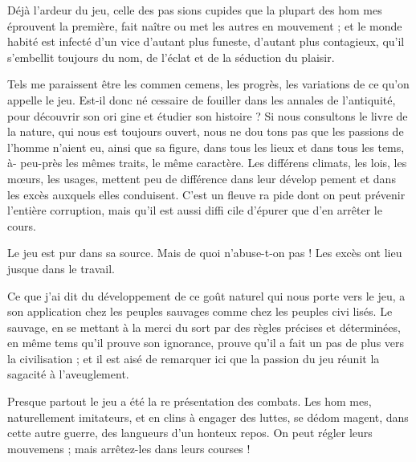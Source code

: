 Déjà l'ardeur du jeu, celle des pas%
sions cupides que la plupart des hom%
mes éprouvent la première, fait naître
ou met les autres en mouvement ; et
le monde habité est infecté d'un vice
d'autant plus funeste, d'autant plus
contagieux, qu'il s'embellit toujours
du nom, de l'éclat et de la séduction
du plaisir.

Tels me paraissent être les commen%
cemens, les progrès, les variations de
ce qu'on appelle le jeu. Est-il donc né%
cessaire de fouiller dans les annales de
l'antiquité, pour découvrir son ori%
gine et étudier son histoire ? Si nous
consultons le livre de la nature, qui
nous est toujours ouvert, nous ne dou%
tons pas que les passions de l'homme
n'aient eu, ainsi que sa figure, dans
tous les lieux et dans tous les tems, à-%
peu-près les mêmes traits, le même
caractère. Les différens climats, les
lois, les mœurs, les usages, mettent
peu de différence dans leur dévelop%
pement et dans les excès auxquels
elles conduisent. C'est un fleuve ra%
pide dont on peut prévenir l'entière
corruption, mais qu'il est aussi diffi%
cile d'épurer que d'en arrêter le cours.

Le jeu est pur dans sa source. Mais
de quoi n'abuse-t-on pas ! Les excès
ont lieu jusque dans le travail.


Ce que j'ai dit du développement de
ce goût naturel qui nous porte vers le
jeu, a son application chez les peuples
sauvages comme chez les peuples civi%
lisés. Le sauvage, en se mettant à la
merci du sort par des règles précises
et déterminées, en même tems qu'il 
prouve son ignorance, prouve qu'il a
fait un pas de plus vers la civilisation ;
et il est aisé de remarquer ici que la
passion du jeu réunit la sagacité à
l'aveuglement.

Presque partout le jeu a été la re%
présentation des combats. Les hom%
mes, naturellement imitateurs, et en%
clins à engager des luttes, se dédom%
magent, dans cette autre guerre, des
langueurs d'un honteux repos. On
peut régler leurs mouvemens ; mais
arrêtez-les dans leurs courses !


